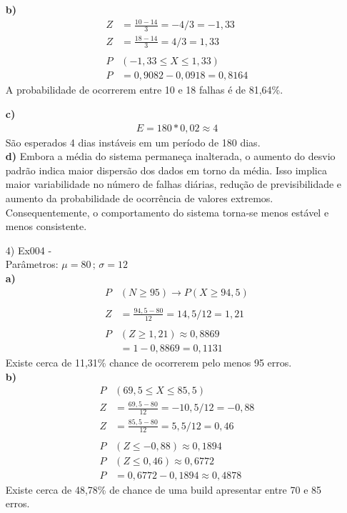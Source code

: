 \documentclass[fleqn, 12pt]{article}
\begin{document}
\begin{itemize}
\textbf{b)}
\begin{align*}
    Z &= \frac{10 - 14}{3}= -4/3 = -1,33\\
    Z & = \frac{18 - 14}{3}= 4/3 = 1,33\\\\
    P&(-1,33 \leq X \leq 1,33)\\
    P &= 0,9082 - 0,0918 = 0,8164
\end{align*}
A probabilidade de ocorrerem entre 10 e 18 falhas é de 81,64\%.

\textbf{c)}
\begin{align*}
    E = 180 * 0,02 \approx 4
\end{align*}
São esperados 4 dias instáveis em um período de 180 dias.\\

\textbf{d)}
Embora a média do sistema permaneça inalterada, o aumento do desvio padrão indica maior dispersão dos dados em torno da média. Isso implica maior variabilidade no número de falhas diárias, redução de previsibilidade e aumento da probabilidade de ocorrência de valores extremos. Consequentemente, o comportamento do sistema torna-se menos estável e menos consistente.\newpage

\item[4)] Ex004 -\\ Parâmetros: $\mu = 80 \,;\, \sigma = 12$\\

\textbf{a)}
\begin{align*}
    P&(N \geq 95) \rightarrow P(X \geq 94,5)\\\\
    Z&=\frac{94,5 - 80}{12}=14,5/12 = 1,21\\\\
    P&(Z \geq 1,21) \approx 0,8869\\
    &=1 - 0,8869 = 0,1131
\end{align*}
Existe cerca de 11,31\% chance de ocorrerem pelo menos 95 erros.\\

\textbf{b)}
\begin{align*}
    P&(69,5 \leq X \leq 85,5)\\
    Z&=\frac{69,5 - 80}{12}=-10,5/12 = -0,88\\
    Z&=\frac{85,5 - 80}{12}=5,5/12 = 0,46\\\\
    P&(Z\leq-0,88)\approx0,1894\\
    P&(Z\leq0,46)\approx0,6772\\
    P&=0,6772 - 0,1894 \approx 0,4878
\end{align*}
Existe cerca de 48,78\% de chance de uma build apresentar entre 70 e 85 erros.\\


\end{itemize}
\end{document}
